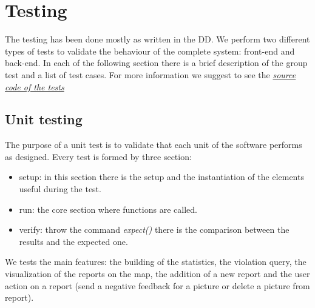 \documentclass[../ITD.tex]{subfiles}
\begin{document}
    \chapter{Testing}\label{ch:testing}
    The testing has been done mostly as written in the DD. We perform two different types of tests to validate the behaviour of the complete system: front-end and back-end.
    In each of the following section there is a brief description of the group test and a list of test cases.
    \newline For more information we suggest to see the \href{https://github.com/fedy97/MorrealeMaddesInnocente/tree/master/safe_streets/test}{\emph{source code of the tests}}
    \section{Unit testing}\label{sec:unit-testing}
    The purpose of a unit test is to validate that each unit of the software performs as designed.
    \newline Every test is formed by three section:
    \begin{itemize}
        \item setup: in this section there is the setup and the instantiation of the elements useful during the test.
        \item run: the core section where functions are called.
        \item verify: throw the command \textit{expect()} there is the comparison between the results and the expected one.
    \end{itemize}
    We tests the main features: the building of the statistics, the violation query, the visualization of the reports on the map, the addition of a new report and the user action on a report (send a negative feedback for a picture or delete a picture from report).
\end{document}
